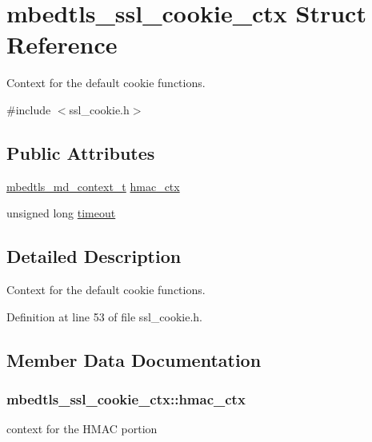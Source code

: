 \hypertarget{structmbedtls__ssl__cookie__ctx}{\section{mbedtls\-\_\-ssl\-\_\-cookie\-\_\-ctx Struct Reference}
\label{structmbedtls__ssl__cookie__ctx}
}


Context for the default cookie functions.  




{\ttfamily \#include $<$ssl\-\_\-cookie.\-h$>$}

\subsection*{Public Attributes}
\begin{DoxyCompactItemize}
\item 
\hyperlink{structmbedtls__md__context__t}{mbedtls\-\_\-md\-\_\-context\-\_\-t} \hyperlink{structmbedtls__ssl__cookie__ctx_a3142057d5ce904db6ee134ff6d5f3b7c}{hmac\-\_\-ctx}
\item 
unsigned long \hyperlink{structmbedtls__ssl__cookie__ctx_adf87598d619f8fcf161965301c423ffb}{timeout}
\end{DoxyCompactItemize}


\subsection{Detailed Description}
Context for the default cookie functions. 

Definition at line 53 of file ssl\-\_\-cookie.\-h.



\subsection{Member Data Documentation}
\hypertarget{structmbedtls__ssl__cookie__ctx_a3142057d5ce904db6ee134ff6d5f3b7c}{
\subsubsection[{hmac\-\_\-ctx}]{ mbedtls\-\_\-ssl\-\_\-cookie\-\_\-ctx\-::hmac\-\_\-ctx}}\label{structmbedtls__ssl__cookie__ctx_a3142057d5ce904db6ee134ff6d5f3b7c}
context for the H\-M\-A\-C portion 

